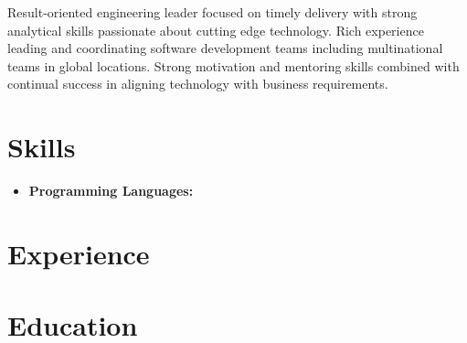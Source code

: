 \documentclass[11pt,a4paper,roman]{moderncv}       %
\begin{document}
\makecvtitle

\small{Result-oriented engineering leader focused on timely delivery with strong analytical skills passionate about cutting edge technology. Rich experience leading and coordinating software development teams including multinational teams in global locations. Strong motivation and mentoring skills combined with continual success in aligning technology with business requirements.}

\section{Skills}

\vspace{6pt}

\begin{itemize}

\item \textbf{Programming Languages:} 

\end{itemize}

\section{Experience}

\vspace{6pt}


\section{Education}

\vspace{5pt}






\end{document}
